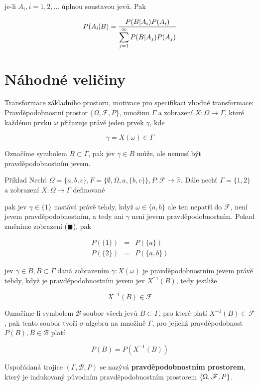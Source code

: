 je-li $A_i,i=1,2,\ldots$ úplnou soustavou jevů. Pak

\[ P(A_i|B)=\frac{P(B|A_i)P(A_i)}{\displaystyle\sumi[j] P(B|A_j)P(A_j)} \]

\section{Náhodné veličiny}
Transformace základního prostoru, motivace pro specifikaci vhodné transformace: Pravděpodobnostní prostor $\{\Omega, \mathscr{F}, P\}$, množinu $\Gamma$ a zobrazení $X:\Omega\to\Gamma$, které každému prvku $\omega$ přiřazuje právě jeden prvek $\gamma$, kde

\[ \gamma=X(\omega)\in\Gamma \]

Označíme symbolem $B\subset\Gamma$, pak jev $\gamma\in B$ může, ale nemusí být pravděpodobnostním jevem.

\begin{note}{Příklad}
Nechť $\Omega=\{a,b,c\}, F=\{\emptyset,\Omega,a,\{b,c\}\}, P:\mathscr{F}\to\mathbb{R}$. Dále nechť $\Gamma=\{1,2\}$ a zobrazení $X:\Omega\to\Gamma$ definované

	\begin{figure}
		
	\end{figure}
	
	pak jev $\gamma\in\{1\}$ nastává právě tehdy, když $\omega\in\{a,b\}$ ale ten nepatří do $\mathscr{F}$, není jevem pravděpodobnostním, a tedy ani $\gamma$ není jevem pravděpodobnostním. Pokud změníme zobrazení ({\color{red}$\blacksquare$}), pak
	
	\begin{eqnarray*}
	P(\{1\}) &=& P(\{a\})\\
	P(\{2\}) &=& P(\{a,b\})
	\end{eqnarray*}
	
	jev $\gamma\in B, B\subset\Gamma$ daná zobrazením $\gamma:X(\omega)$ je pravděpodobnostním jevem právě tehdy, když je pravděpodobnostním jevem jev $X^{^-1}(B)$, tedy jestliže
	
	\[ X^{-1}(B)\in\mathscr{F} \]
	
	Označíme-li symbolem $\mathscr{B}$ soubor všech jevů $B\subset\Gamma$, pro které platí $X^{-1}(B)\subset\mathscr{F}$, pak tento soubor tvoří $\sigma$-algebru na množině $\Gamma$, pro jejichž pravděpodobnost $P(B),B\in\mathscr{B}$ platí
	
	\[ P(B)=P(X^{-1}(B)) \]
	
	Uspořádaná trojice $(\Gamma,\mathscr{B},P)$ se nazývá \textbf{pravděpodobnostním prostorem}, který je indukovaný původním pravděpodobnostním prostorem $\brs{\Omega,\mathscr{F}, P}$.
	\end{note}
	

